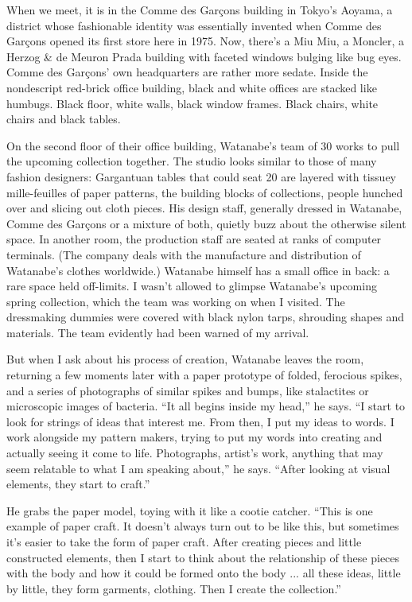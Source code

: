 When we meet, it is in the Comme des Garçons building in Tokyo's Aoyama,
a district whose fashionable identity was essentially invented when
Comme des Garçons opened its first store here in 1975. Now, there's a
Miu Miu, a Moncler, a Herzog \& de Meuron Prada building with faceted
windows bulging like bug eyes. Comme des Garçons' own headquarters are
rather more sedate. Inside the nondescript red-brick office building,
black and white offices are stacked like humbugs. Black floor, white
walls, black window frames. Black chairs, white chairs and black tables.

On the second floor of their office building, Watanabe's team of 30
works to pull the upcoming collection together. The studio looks similar
to those of many fashion designers: Gargantuan tables that could seat 20
are layered with tissuey mille-feuilles of paper patterns, the building
blocks of collections, people hunched over and slicing out cloth pieces.
His design staff, generally dressed in Watanabe, Comme des Garçons or a
mixture of both, quietly buzz about the otherwise silent space. In
another room, the production staff are seated at ranks of computer
terminals. (The company deals with the manufacture and distribution of
Watanabe's clothes worldwide.) Watanabe himself has a small office in
back: a rare space held off-limits. I wasn't allowed to glimpse
Watanabe's upcoming spring collection, which the team was working on
when I visited. The dressmaking dummies were covered with black nylon
tarps, shrouding shapes and materials. The team evidently had been
warned of my arrival.

But when I ask about his process of creation, Watanabe leaves the room,
returning a few moments later with a paper prototype of folded,
ferocious spikes, and a series of photographs of similar spikes and
bumps, like stalactites or microscopic images of bacteria. ``It all
begins inside my head,'' he says. ``I start to look for strings of ideas
that interest me. From then, I put my ideas to words. I work alongside
my pattern makers, trying to put my words into creating and actually
seeing it come to life. Photographs, artist's work, anything that may
seem relatable to what I am speaking about,'' he says. ``After looking
at visual elements, they start to craft.''

He grabs the paper model, toying with it like a cootie catcher. ``This
is one example of paper craft. It doesn't always turn out to be like
this, but sometimes it's easier to take the form of paper craft. After
creating pieces and little constructed elements, then I start to think
about the relationship of these pieces with the body and how it could be
formed onto the body ... all these ideas, little by little, they form
garments, clothing. Then I create the collection.''

